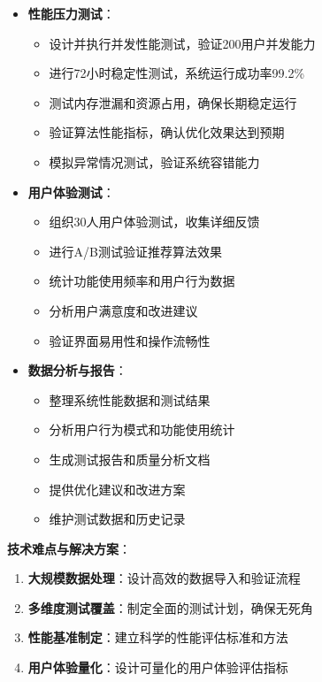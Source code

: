 \documentclass[12pt,a4paper]{article}
\begin{document}
\begin{itemize}
    \item \textbf{性能压力测试}：
    \begin{itemize}
        \item 设计并执行并发性能测试，验证200用户并发能力
        \item 进行72小时稳定性测试，系统运行成功率99.2\%
        \item 测试内存泄漏和资源占用，确保长期稳定运行
        \item 验证算法性能指标，确认优化效果达到预期
        \item 模拟异常情况测试，验证系统容错能力
    \end{itemize}
    
    \item \textbf{用户体验测试}：
    \begin{itemize}
        \item 组织30人用户体验测试，收集详细反馈
        \item 进行A/B测试验证推荐算法效果
        \item 统计功能使用频率和用户行为数据
        \item 分析用户满意度和改进建议
        \item 验证界面易用性和操作流畅性
    \end{itemize}
    
    \item \textbf{数据分析与报告}：
    \begin{itemize}
        \item 整理系统性能数据和测试结果
        \item 分析用户行为模式和功能使用统计
        \item 生成测试报告和质量分析文档
        \item 提供优化建议和改进方案
        \item 维护测试数据和历史记录
    \end{itemize}
\end{itemize}

\textbf{技术难点与解决方案}：
\begin{enumerate}
    \item \textbf{大规模数据处理}：设计高效的数据导入和验证流程
    \item \textbf{多维度测试覆盖}：制定全面的测试计划，确保无死角
    \item \textbf{性能基准制定}：建立科学的性能评估标准和方法
    \item \textbf{用户体验量化}：设计可量化的用户体验评估指标
\end{enumerate}
\end{document}
